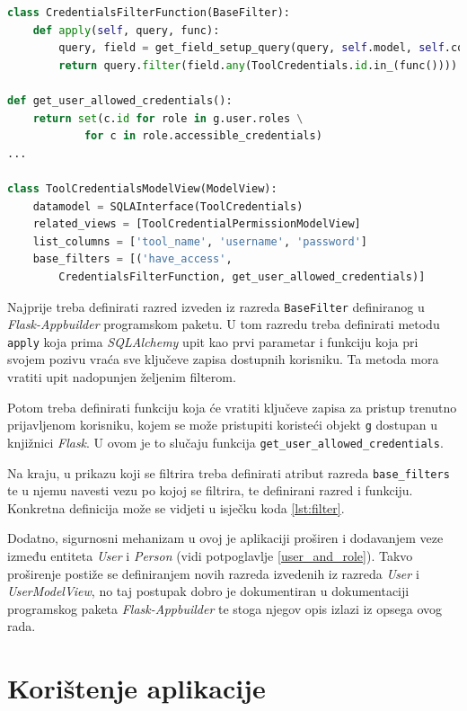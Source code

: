 \documentclass[times, utf8, diplomski]{fer}
\begin{document}
\begin{lstlisting}[language=Python,basicstyle=\scriptsize,frame=single,caption={
filtriranje pristupnih podataka},label={lst:filter}]
class CredentialsFilterFunction(BaseFilter):
    def apply(self, query, func):
        query, field = get_field_setup_query(query, self.model, self.column_name)
        return query.filter(field.any(ToolCredentials.id.in_(func())))

def get_user_allowed_credentials():
    return set(c.id for role in g.user.roles \
            for c in role.accessible_credentials)
...

class ToolCredentialsModelView(ModelView):
    datamodel = SQLAInterface(ToolCredentials)
    related_views = [ToolCredentialPermissionModelView]
    list_columns = ['tool_name', 'username', 'password']
    base_filters = [('have_access',
        CredentialsFilterFunction, get_user_allowed_credentials)]
\end{lstlisting}

Najprije treba definirati razred izveden iz razreda \texttt{BaseFilter}
definiranog u \emph{Flask-Appbuilder} programskom paketu. U tom razredu treba
definirati metodu \texttt{apply} koja prima \emph{SQLAlchemy} upit kao prvi
parametar i funkciju koja pri svojem pozivu vraća sve ključeve zapisa dostupnih
korisniku. Ta metoda mora vratiti upit nadopunjen željenim filterom.

Potom treba definirati funkciju koja će vratiti ključeve zapisa za pristup
trenutno prijavljenom korisniku, kojem se može pristupiti koristeći objekt
\texttt{g} dostupan u knjižnici \emph{Flask}. U ovom je to slučaju funkcija
\texttt{get\_user\_allowed\_credentials}.

Na kraju, u prikazu koji se filtrira treba definirati atribut razreda
\texttt{base\_filters} te u njemu navesti vezu po kojoj se filtrira, te
definirani razred i funkciju. Konkretna definicija može se vidjeti u isječku
koda \ref{lst:filter}.

Dodatno, sigurnosni mehanizam u ovoj je aplikaciji proširen i dodavanjem veze
između entiteta \emph{User} i \emph{Person} (vidi potpoglavlje
\ref{user_and_role}). Takvo proširenje postiže se definiranjem novih razreda
izvedenih iz razreda \emph{User} i \emph{UserModelView}, no taj postupak dobro
je dokumentiran u dokumentaciji programskog paketa \emph{Flask-Appbuilder} te
stoga njegov opis izlazi iz opsega ovog rada.

\section{Korištenje aplikacije}
\end{document}
